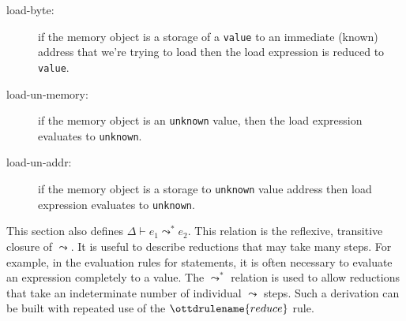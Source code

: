 \documentclass[11pt]{article}
\begin{document}
\begin{description}
\item[load-byte:] if the memory object is a storage of a \verb|value|
  to an immediate (known) address that we're trying to load then the
  load expression is reduced to \verb|value|.
\item[load-un-memory:] if the memory object is an \verb|unknown| value,
  then the load expression evaluates to \verb|unknown|.
\item[load-un-addr:] if the memory object is a storage to
  \verb|unknown| value address then load expression evaluates to
  \verb|unknown|.
\end{description}

This section also defines $\Delta \vdash e_1 \leadsto^{*} e_2$.  This relation
is the reflexive, transitive closure of $\leadsto$.  It is useful to describe
reductions that may take many steps.  For example, in the evaluation rules for
statements, it is often necessary to evaluate an expression completely to a
value.  The $\leadsto^{*}$ relation is used to allow reductions that take an
indeterminate number of individual $\leadsto$ steps.  Such a derivation can be
built with repeated use of the $\ottdrulename{reduce}$ rule.

\medskip

\ottdefnsreduceXXexp

\ottdefnshelpers

\ottdefnsmultistepXXexp
\end{document}
